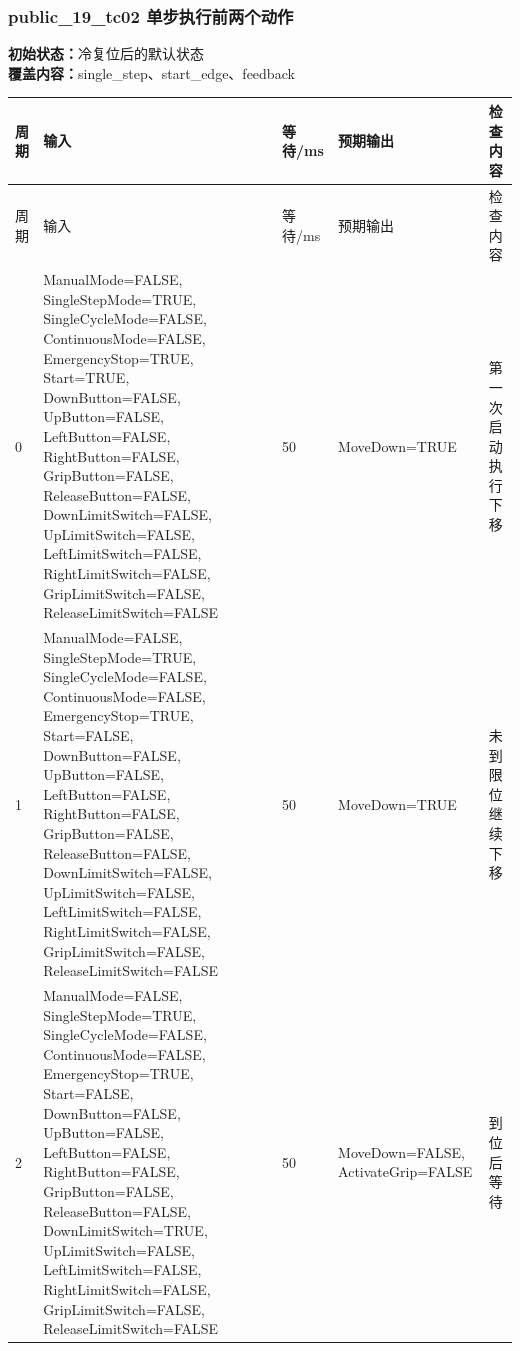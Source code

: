 \subsubsection{{\ttfamily public\_19\_tc02} 单步执行前两个动作}

\noindent\textbf{初始状态：}冷复位后的默认状态\\

\textbf{覆盖内容：}single\_step、start\_edge、feedback

\begin{longtable}{L{1.0cm}L{4.7cm}L{1.4cm}L{4.0cm}L{2.1cm}}

\toprule

周期 & 输入 & 等待/ms & 预期输出 & 检查内容\\

\midrule

\endfirsthead

\toprule

周期 & 输入 & 等待/ms & 预期输出 & 检查内容\\

\midrule

\endhead

0 & ManualMode=FALSE, SingleStepMode=TRUE, SingleCycleMode=FALSE, ContinuousMode=FALSE, EmergencyStop=TRUE, Start=TRUE, DownButton=FALSE, UpButton=FALSE, LeftButton=FALSE, RightButton=FALSE, GripButton=FALSE, ReleaseButton=FALSE, DownLimitSwitch=FALSE, UpLimitSwitch=FALSE, LeftLimitSwitch=FALSE, RightLimitSwitch=FALSE, GripLimitSwitch=FALSE, ReleaseLimitSwitch=FALSE & 50 & MoveDown=TRUE & 第一次启动执行下移\\

1 & ManualMode=FALSE, SingleStepMode=TRUE, SingleCycleMode=FALSE, ContinuousMode=FALSE, EmergencyStop=TRUE, Start=FALSE, DownButton=FALSE, UpButton=FALSE, LeftButton=FALSE, RightButton=FALSE, GripButton=FALSE, ReleaseButton=FALSE, DownLimitSwitch=FALSE, UpLimitSwitch=FALSE, LeftLimitSwitch=FALSE, RightLimitSwitch=FALSE, GripLimitSwitch=FALSE, ReleaseLimitSwitch=FALSE & 50 & MoveDown=TRUE & 未到限位继续下移\\

2 & ManualMode=FALSE, SingleStepMode=TRUE, SingleCycleMode=FALSE, ContinuousMode=FALSE, EmergencyStop=TRUE, Start=FALSE, DownButton=FALSE, UpButton=FALSE, LeftButton=FALSE, RightButton=FALSE, GripButton=FALSE, ReleaseButton=FALSE, DownLimitSwitch=TRUE, UpLimitSwitch=FALSE, LeftLimitSwitch=FALSE, RightLimitSwitch=FALSE, GripLimitSwitch=FALSE, ReleaseLimitSwitch=FALSE & 50 & MoveDown=FALSE, ActivateGrip=FALSE & 到位后等待\\


\end{longtable}
